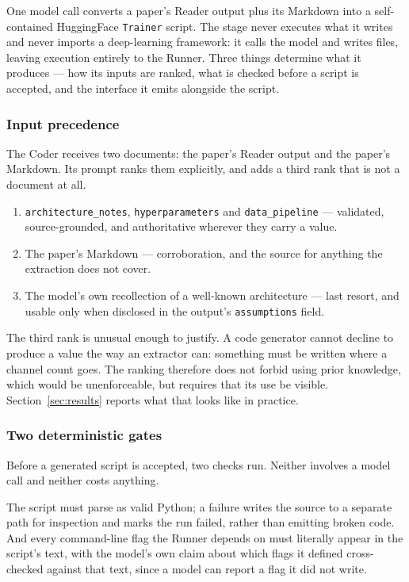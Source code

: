 \documentclass[11pt]{article}
\begin{document}
One model call converts a paper's Reader output plus its Markdown into a self-contained
HuggingFace \texttt{Trainer} script. The stage never executes what it writes and never
imports a deep-learning framework: it calls the model and writes files, leaving execution
entirely to the Runner. Three things determine what it produces --- how its inputs are
ranked, what is checked before a script is accepted, and the interface it emits alongside
the script.


\subsubsection{Input precedence}

The Coder receives two documents: the paper's Reader output and the paper's Markdown. Its
prompt ranks them explicitly, and adds a third rank that is not a document at all.

\begin{enumerate}
  \item \texttt{architecture\_notes}, \texttt{hyperparameters} and \texttt{data\_pipeline}
        --- validated, source-grounded, and authoritative wherever they carry a value.
  \item The paper's Markdown --- corroboration, and the source for anything the extraction
        does not cover.
  \item The model's own recollection of a well-known architecture --- last resort, and
        usable only when disclosed in the output's \texttt{assumptions} field.
\end{enumerate}

The third rank is unusual enough to justify. A code generator cannot decline to produce a
value the way an extractor can: something must be written where a channel count goes. The
ranking therefore does not forbid using prior knowledge, which would be unenforceable, but
requires that its use be visible. Section~\ref{sec:results} reports what that looks like
in practice.

\subsubsection{Two deterministic gates}

Before a generated script is accepted, two checks run. Neither involves a model call and
neither costs anything.

The script must parse as valid Python; a failure writes the source to a separate path for
inspection and marks the run failed, rather than emitting broken code. And every
command-line flag the Runner depends on must literally appear in the script's text, with
the model's own claim about which flags it defined cross-checked against that text, since
a model can report a flag it did not write.
\end{document}
